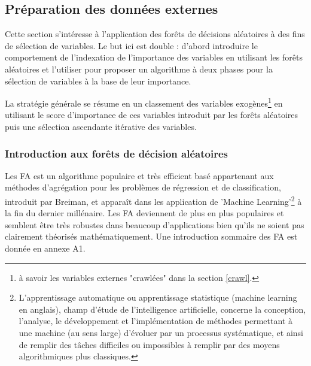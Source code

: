 	\subsection{Préparation des données externes}
	Cette section s’intéresse à l'application des forêts de décisions aléatoires à des fins de sélection de variables. Le but ici est double : d'abord introduire le comportement de l'indexation de l'importance des variables en utilisant les forêts aléatoires et l'utiliser pour proposer un algorithme à deux phases pour la sélection de variables à la base de leur importance.\par
	La stratégie générale se résume en un classement des variables exogènes\footnote{à savoir les variables externes "crawlées" dans la section \ref{crawl}.} en utilisant le score d'importance de ces variables introduit par les forêts aléatoires puis une sélection ascendante itérative des variables.
	\subsubsection{Introduction aux forêts de décision aléatoires}
	Les FA est un algorithme populaire et très efficient basé appartenant aux méthodes d'agrégation pour les problèmes de régression et de classification, introduit par Breiman\cite{BREI01}, et apparaît dans les application de 'Machine Learning'\footnote{L'apprentissage automatique ou apprentissage statistique (machine learning en anglais), champ d'étude de l'intelligence artificielle, concerne la conception, l'analyse, le développement et l'implémentation de méthodes permettant à une machine (au sens large) d'évoluer par un processus systématique, et ainsi de remplir des tâches difficiles ou impossibles à remplir par des moyens algorithmiques plus classiques.} à la fin du dernier millénaire\cite{DITRI99}. Les FA deviennent de plus en plus populaires et semblent être très robustes dans beaucoup d'applications bien qu'ils ne soient pas clairement théorisés mathématiquement\cite{BIA08}. Une introduction sommaire des FA est donnée en annexe A1.
	\par

